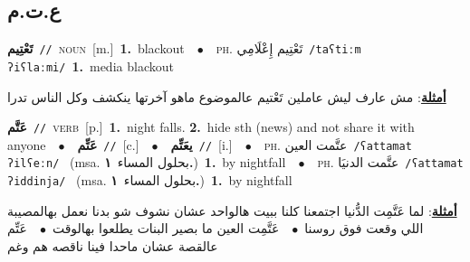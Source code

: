 \documentclass[10pt,a4paper,twoside]{article} %
\begin{document}
\begin{multicols}{2}
\vspace{-3mm}
\subsection*{\color{blue}\foreignlanguage{arabic}{ع.ت.م}\color{blue}{}} 

{\setlength\topsep{0pt}\textbf{\foreignlanguage{arabic}{تَعْتِيم}}\ {\color{gray}\texttt{//}\color{black}}\ \textsc{noun}\ [m.]\ \textbf{1.}~blackout\ \ $\bullet$\ \ \textsc{ph.} \color{gray} \foreignlanguage{arabic}{تَعْتِيم إِعْلَامِي}\color{black}\ {\color{gray}\texttt{/{\sffamily taʕtiːm ʔiʕlaːmi}/}\color{black}}\ \textbf{1.}~media blackout\  \begin{flushright}\color{gray}\foreignlanguage{arabic}{\textbf{\underline{\foreignlanguage{arabic}{أمثلة}}}: مش عارف ليش عاملين تَعْتيم عالموضوع ماهو آخرتها ينكشف وكل الناس تدرا}\end{flushright}\color{black}} \vspace{2mm}

{\setlength\topsep{0pt}\textbf{\foreignlanguage{arabic}{عَتَّم}}\ {\color{gray}\texttt{//}\color{black}}\ \textsc{verb}\ [p.]\ \textbf{1.}~night falls.  \textbf{2.}~hide sth (news) and not share it with anyone\ \ $\bullet$\ \ \setlength\topsep{0pt}\textbf{\foreignlanguage{arabic}{عَتِّم}}\ {\color{gray}\texttt{//}\color{black}}\ [c.]\ \ $\bullet$\ \ \setlength\topsep{0pt}\textbf{\foreignlanguage{arabic}{يعَتِّم}}\ {\color{gray}\texttt{//}\color{black}}\ [i.]\ \ $\bullet$\ \ \textsc{ph.} \color{gray} \foreignlanguage{arabic}{عتَّمت العين}\color{black}\ {\color{gray}\texttt{/{\sffamily ʕattamat ʔilʕeːn}/}\color{black}}\ \color{gray} (msa. \foreignlanguage{arabic}{بحلول المساء}~\foreignlanguage{arabic}{\textbf{١.}})\color{black}\ \textbf{1.}~by nightfall\ \ $\bullet$\ \ \textsc{ph.} \color{gray} \foreignlanguage{arabic}{عتَّمت الدنيَا}\color{black}\ {\color{gray}\texttt{/{\sffamily ʕattamat ʔiddinja}/}\color{black}}\ \color{gray} (msa. \foreignlanguage{arabic}{بحلول المساء}~\foreignlanguage{arabic}{\textbf{١.}})\color{black}\ \textbf{1.}~by nightfall\  \begin{flushright}\color{gray}\foreignlanguage{arabic}{\textbf{\underline{\foreignlanguage{arabic}{أمثلة}}}: لما عَتَّمِت الدُّنيا اجتمعنا كلنا ببيت هالواحد عشان نشوف شو بدنا نعمل بهالمصيبة اللي وقعت فوق روسنا\ $\bullet$\ \  عَتَّمِت العين ما بصير البنات يطلعوا بهالوقت\ $\bullet$\ \  عَتِّم عالقصة عشان ماحدا فينا ناقصه هم وغم}\end{flushright}\color{black}} \vspace{2mm}


\end{multicols}
\end{document}
